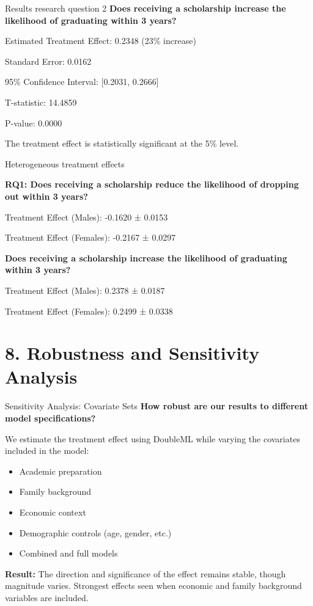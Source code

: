 \documentclass[aspectratio=169]{beamer}
\begin{document}
\begin{frame}{Results research question 2}
\textbf{Does receiving a scholarship increase the likelihood of graduating within 3 years?}

Estimated Treatment Effect: 0.2348 (23\% increase)

Standard Error: 0.0162

95\% Confidence Interval: [0.2031, 0.2666]

T-statistic: 14.4859

P-value: 0.0000

The treatment effect is statistically significant at the 5\% level.

\end{frame}

\begin{frame}{Heterogeneous treatment effects}

\textbf{RQ1: Does receiving a scholarship reduce the likelihood of dropping out within 3 years?}

Treatment Effect (Males): -0.1620 ± 0.0153

Treatment Effect (Females): -0.2167 ± 0.0297

\textbf{Does receiving a scholarship increase the likelihood of graduating within 3 years?}

Treatment Effect (Males): 0.2378 ± 0.0187

Treatment Effect (Females): 0.2499 ± 0.0338


\end{frame}

\section{8. Robustness and Sensitivity Analysis}

\begin{frame}{Sensitivity Analysis: Covariate Sets}
\textbf{How robust are our results to different model specifications?}
\vspace{10pt}

We estimate the treatment effect using DoubleML while varying the covariates included in the model:

\begin{itemize}
    \item Academic preparation
    \item Family background
    \item Economic context
    \item Demographic controls (age, gender, etc.)
    \item Combined and full models
\end{itemize}

\vspace{5pt}
\textbf{Result:} The direction and significance of the effect remains stable, though magnitude varies. Strongest effects seen when economic and family background variables are included.
\end{frame}
\end{document}
